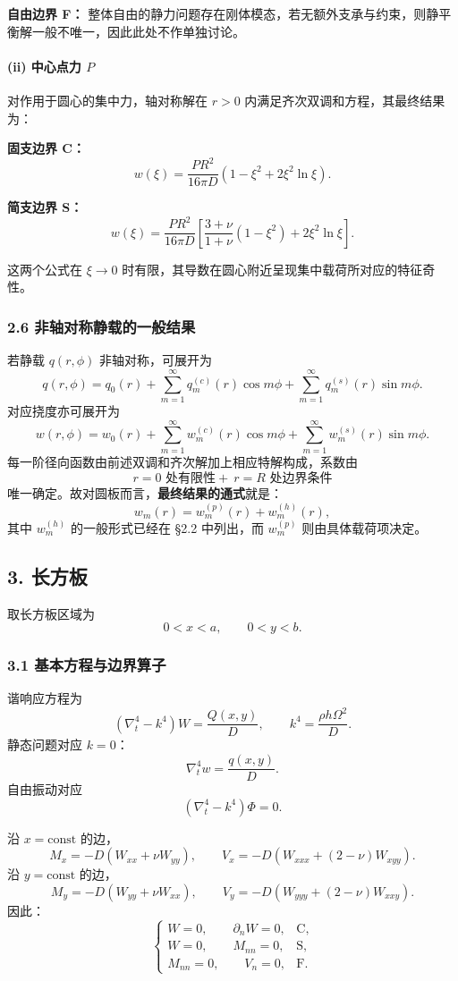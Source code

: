 \documentclass[12pt]{ctexart}
\begin{document}
\textbf{自由边界 F：}
整体自由的静力问题存在刚体模态，若无额外支承与约束，则静平衡解一般不唯一，因此此处不作单独讨论。

\paragraph{(ii) 中心点力 \(P\)}
对作用于圆心的集中力，轴对称解在 \(r>0\) 内满足齐次双调和方程，其最终结果为：

\textbf{固支边界 C：}
\[
w(\xi)
=
\frac{PR^2}{16\pi D}
\left(
1-\xi^2+2\xi^2\ln\xi
\right).
\]

\textbf{简支边界 S：}
\[
w(\xi)
=
\frac{PR^2}{16\pi D}
\left[
\frac{3+\nu}{1+\nu}(1-\xi^2)+2\xi^2\ln\xi
\right].
\]

这两个公式在 \(\xi\to 0\) 时有限，其导数在圆心附近呈现集中载荷所对应的特征奇性。

\subsubsection*{2.6 非轴对称静载的一般结果}
若静载 \(q(r,\phi)\) 非轴对称，可展开为
\[
q(r,\phi)=q_0(r)+\sum_{m=1}^\infty q_m^{(c)}(r)\cos m\phi
+\sum_{m=1}^\infty q_m^{(s)}(r)\sin m\phi.
\]
对应挠度亦可展开为
\[
w(r,\phi)=w_0(r)+\sum_{m=1}^\infty w_m^{(c)}(r)\cos m\phi
+\sum_{m=1}^\infty w_m^{(s)}(r)\sin m\phi.
\]
每一阶径向函数由前述双调和齐次解加上相应特解构成，系数由
\[
r=0 \text{ 处有限性}+\ r=R \text{ 处边界条件}
\]
唯一确定。故对圆板而言，\textbf{最终结果的通式}就是：
\[
w_m(r)=w_m^{(p)}(r)+w_m^{(h)}(r),
\]
其中 \(w_m^{(h)}\) 的一般形式已经在 \S 2.2 中列出，而 \(w_m^{(p)}\) 则由具体载荷项决定。

\subsection*{3. 长方板}

取长方板区域为
\[
0<x<a,\qquad 0<y<b.
\]

\subsubsection*{3.1 基本方程与边界算子}
谐响应方程为
\[
\left(\nabla_t^4-k^4\right)W=\frac{Q(x,y)}{D},
\qquad
k^4=\frac{\rho h \Omega^2}{D}.
\]
静态问题对应 \(k=0\)：
\[
\nabla_t^4 w=\frac{q(x,y)}{D}.
\]
自由振动对应
\[
\left(\nabla_t^4-k^4\right)\Phi=0.
\]

沿 \(x=\text{const}\) 的边，
\[
M_x=-D\left(W_{xx}+\nu W_{yy}\right),
\qquad
V_x=-D\left(W_{xxx}+(2-\nu)W_{xyy}\right).
\]
沿 \(y=\text{const}\) 的边，
\[
M_y=-D\left(W_{yy}+\nu W_{xx}\right),
\qquad
V_y=-D\left(W_{yyy}+(2-\nu)W_{xxy}\right).
\]
因此：
\[
\begin{cases}
W=0,\qquad \partial_n W=0, & \text{C},\\[6pt]
W=0,\qquad M_{nn}=0, & \text{S},\\[6pt]
M_{nn}=0,\qquad V_n=0, & \text{F}.
\end{cases}
\]
\end{document}
